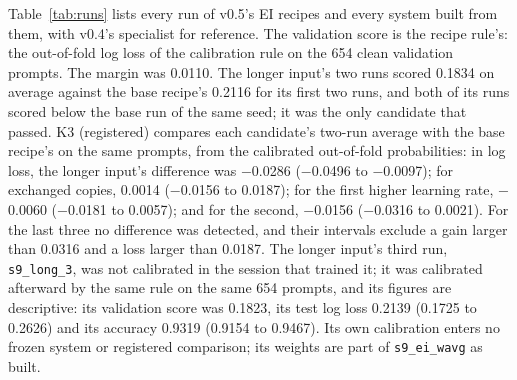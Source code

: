 \documentclass[11pt,letterpaper]{article}
\newcommand{\sysname}[1]{\texttt{#1}}
\begin{document}
Table~\ref{tab:runs} lists every run of v0.5's EI recipes and every system built from them, with v0.4's specialist for reference. The validation score is the recipe rule's: the out-of-fold log loss of the calibration rule on the 654 clean validation prompts. The margin was 0.0110. The longer input's two runs scored 0.1834 on average against the base recipe's 0.2116 for its first two runs, and both of its runs scored below the base run of the same seed; it was the only candidate that passed. K3 (registered) compares each candidate's two-run average with the base recipe's on the same prompts, from the calibrated out-of-fold probabilities: in log loss, the longer input's difference was $-$0.0286 ($-$0.0496 to $-$0.0097); for exchanged copies, 0.0014 ($-$0.0156 to 0.0187); for the first higher learning rate, $-$0.0060 ($-$0.0181 to 0.0057); and for the second, $-$0.0156 ($-$0.0316 to 0.0021). For the last three no difference was detected, and their intervals exclude a gain larger than 0.0316 and a loss larger than 0.0187. The longer input's third run, \sysname{s9\_long\_3}, was not calibrated in the session that trained it; it was calibrated afterward by the same rule on the same 654 prompts, and its figures are descriptive: its validation score was 0.1823, its test log loss 0.2139 (0.1725 to 0.2626) and its accuracy 0.9319 (0.9154 to 0.9467). Its own calibration enters no frozen system or registered comparison; its weights are part of \sysname{s9\_ei\_wavg} as built.

\begin{table}[H]
\centering\scriptsize
\caption{Every run and system of v0.5's Evidence Inference 2.0 recipes (the specialist is \texttt{s9\_ei\_wavg}). The validation score is the out-of-fold log loss of the calibration rule on the 654 clean validation prompts (lower is better); the test columns give the estimate and its 95 percent interval from 1,000 article resamples on the 1,218 test prompts, after each system's own calibration. ECE is the expected calibration error, whose percentile interval can lie above its estimate, since the ECE is biased upward in resamples. \texttt{s9\_b} and \texttt{s9\_ei} average their runs' probabilities; \texttt{s9\_ei\_wavg} averages their weights; \texttt{s9\_ei\_wavg\_sa} adds the average with the exchanged prompt's answer. Runs that were not run on the test split are marked NOT RUN. \textsuperscript{a}v0.4's score, on all 1,237 validation prompts, is not on the same prompts. \textsuperscript{b}Calibrated afterward by the same rule (descriptive); the recipe rule did not score this run alone.}
\label{tab:runs}

\end{table}
\end{document}
